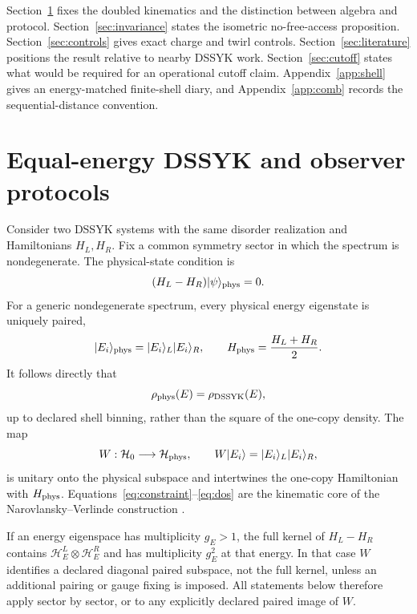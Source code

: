 \documentclass[11pt]{article}
\newcommand{\cH}{\mathcal H}
\begin{document}
Section~\ref{sec:dssyk} fixes the doubled kinematics and the distinction
between algebra and protocol.  Section~\ref{sec:invariance} states the
isometric no-free-access proposition.  Section~\ref{sec:controls} gives exact
charge and twirl controls.  Section~\ref{sec:literature} positions the result
relative to nearby DSSYK work.  Section~\ref{sec:cutoff} states what would be
required for an operational cutoff claim.  Appendix~\ref{app:shell} gives an
energy-matched finite-shell diary, and Appendix~\ref{app:comb} records the
sequential-distance convention.

\section{Equal-energy DSSYK and observer protocols}
\label{sec:dssyk}

Consider two DSSYK systems with the same disorder realization and Hamiltonians
$H_L,H_R$.  Fix a common symmetry sector in which the spectrum is
nondegenerate.  The physical-state condition is
\begin{equation}
  (H_L-H_R)|\psi\rangle_{\rm phys}=0.
  \label{eq:constraint}
\end{equation}
For a generic nondegenerate spectrum, every physical energy eigenstate is
uniquely paired,
\begin{equation}
  |E_i\rangle_{\rm phys}=|E_i\rangle_L|E_i\rangle_R,
  \qquad
  H_{\rm phys}=\frac{H_L+H_R}{2}.
  \label{eq:paired}
\end{equation}
It follows directly that
\begin{equation}
  \rho_{\rm phys}(E)=\rho_{\rm DSSYK}(E),
  \label{eq:dos}
\end{equation}
up to declared shell binning, rather than the square of the one-copy density.
The map
\begin{equation}
  W:\cH_0\longrightarrow \cH_{\rm phys},
  \qquad W|E_i\rangle=|E_i\rangle_L|E_i\rangle_R,
  \label{eq:W}
\end{equation}
is unitary onto the physical subspace and intertwines the one-copy Hamiltonian
with $H_{\rm phys}$.  Equations~\eqref{eq:constraint}--\eqref{eq:dos} are the
kinematic core of the Narovlansky--Verlinde construction
\citep{NarovlanskyVerlinde2023}.

If an energy eigenspace has multiplicity $g_E>1$, the full kernel of
$H_L-H_R$ contains $\cH_E^L\otimes\cH_E^R$ and has multiplicity $g_E^2$ at
that energy.  In that case $W$ identifies a declared diagonal paired subspace,
not the full kernel, unless an additional pairing or gauge fixing is imposed.
All statements below therefore apply sector by sector, or to any explicitly
declared paired image of $W$.
\end{document}
